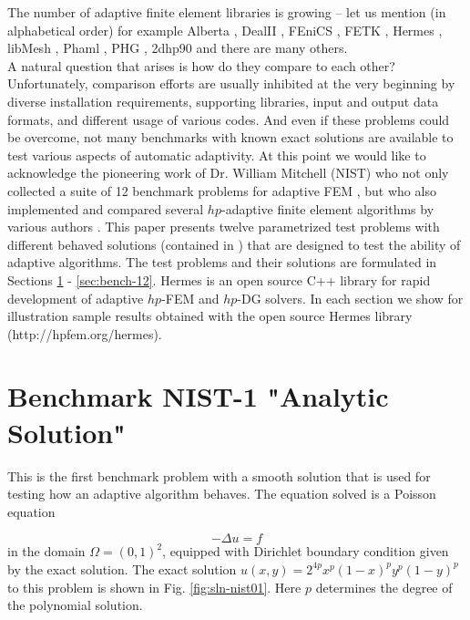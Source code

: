\documentclass[12pt]{elsarticle}
\begin{document}
The number of adaptive finite element libraries is growing
-- let us mention (in alphabetical order) for example Alberta
\cite{alberta}, DealII \cite{dealii}, FEniCS
\cite{fenics}, FETK \cite{fetk}, Hermes \cite{hermes}, libMesh \cite{libmesh},
Phaml \cite{phaml}, PHG \cite{phg}, 2dhp90 \cite{2dhp90} and there are many others.\\
A natural question that arises is how do they compare to each other?
Unfortunately, comparison efforts are usually inhibited at the very beginning
by diverse installation requirements, supporting libraries, input and output
data formats, and different usage of various codes. And even if these problems
could be overcome, not many benchmarks with known exact solutions are
available to test various aspects of automatic adaptivity.
At this point we would like to acknowledge the pioneering work of Dr. William Mitchell
(NIST) who not only collected a suite of 12 benchmark problems
for adaptive FEM \cite{mitchell-1}, but who also implemented
and compared several $hp$-adaptive finite element algorithms by various
authors \cite{mitchell-2}.
This paper presents twelve parametrized test problems with different behaved
solutions (contained in \cite{mitchell-1}) that are
designed to test the ability of adaptive algorithms.
The test problems and their
solutions are formulated in Sections \ref{sec:bench-1} - \ref{sec:bench-12}.
{\sc Hermes} is an open source C++ library for
rapid development of adaptive $hp$-FEM and $hp$-DG solvers.
In each section we show for illustration sample results obtained with the open
source {\sc Hermes} library (http://hpfem.org/hermes).

\section{Benchmark NIST-1 "Analytic Solution"}
\label{sec:bench-1}

This is the first benchmark problem with a smooth solution
that is used for testing how an adaptive algorithm behaves.
The equation solved is a Poisson equation

\begin{equation} \label{poisson}
-\Delta u = f
\end{equation}
in the domain $\Omega = (0, 1)^2$, equipped with Dirichlet
boundary condition given by the exact solution.
The exact solution $u(x, y) = 2^{4p}x^{p}(1-x)^{p}y^{p}(1-y)^{p}$
to this problem is shown in Fig. \ref{fig:sln-nist01}.
Here $p$ determines the degree of the polynomial solution.
\end{document}
